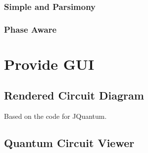 \subsubsection{Simple and Parsimony}

\subsubsection{Phase Aware}

\section{Provide GUI}
\subsection{Rendered Circuit Diagram}
Based on the code for JQuantum.


\subsection{Quantum Circuit Viewer}